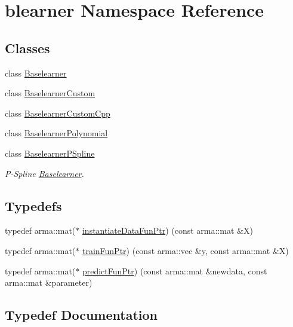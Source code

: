 \hypertarget{namespaceblearner}{}\section{blearner Namespace Reference}
\label{namespaceblearner}
\subsection*{Classes}
\begin{DoxyCompactItemize}
\item 
class \mbox{\hyperlink{classblearner_1_1_baselearner}{Baselearner}}
\item 
class \mbox{\hyperlink{classblearner_1_1_baselearner_custom}{Baselearner\+Custom}}
\item 
class \mbox{\hyperlink{classblearner_1_1_baselearner_custom_cpp}{Baselearner\+Custom\+Cpp}}
\item 
class \mbox{\hyperlink{classblearner_1_1_baselearner_polynomial}{Baselearner\+Polynomial}}
\item 
class \mbox{\hyperlink{classblearner_1_1_baselearner_p_spline}{Baselearner\+P\+Spline}}
\begin{DoxyCompactList}\small\item\em P-\/\+Spline \mbox{\hyperlink{classblearner_1_1_baselearner}{Baselearner}}. \end{DoxyCompactList}\end{DoxyCompactItemize}
\subsection*{Typedefs}
\begin{DoxyCompactItemize}
\item 
typedef arma\+::mat($\ast$ \mbox{\hyperlink{namespaceblearner_a10cec16134a934fb9defbdc2c2011f2a}{instantiate\+Data\+Fun\+Ptr}}) (const arma\+::mat \&X)
\item 
typedef arma\+::mat($\ast$ \mbox{\hyperlink{namespaceblearner_a5e2b38edf05e32681bee136af9ae505d}{train\+Fun\+Ptr}}) (const arma\+::vec \&y, const arma\+::mat \&X)
\item 
typedef arma\+::mat($\ast$ \mbox{\hyperlink{namespaceblearner_a93d5b51440d434704d2bde9dee652f6e}{predict\+Fun\+Ptr}}) (const arma\+::mat \&newdata, const arma\+::mat \&parameter)
\end{DoxyCompactItemize}


\subsection{Typedef Documentation}
\mbox{\label{namespaceblearner_a10cec16134a934fb9defbdc2c2011f2a}} 
